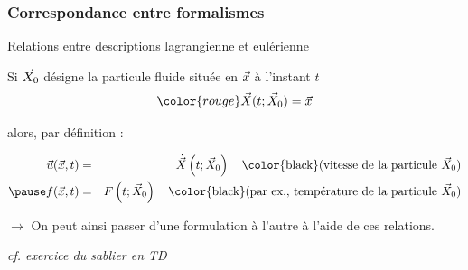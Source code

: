 \subsubsection{Correspondance entre formalismes}
\begin{frame}{Relations entre descriptions lagrangienne et eulérienne}

\small


Si $\vec{X}_0$ désigne la particule fluide située en $\vec{x}$ à l'instant $t$
\[
	\color{rouge}
	\myvec{X}(t; \myvec{X}_0) = \myvec{x}
\]

\pause

alors, par définition :

{\color{rouge}
\begin{eqnarray}
	\myvec{u}(\myvec{x}, t) & = & \dot{\myvec{X}}\left ( t; \myvec{X}_0 \right )
	\quad \mbox{\color{black}(vitesse de la particule $\myvec{X}_0$)}
	\\ \pause
	f(\myvec{x}, t) & = & F\left ( t; \myvec{X}_0 \right )
	\quad \mbox{\color{black}(par ex., température de la particule $\myvec{X}_0$)}
\end{eqnarray}
}

\bigskip

$\rightarrow$ On peut ainsi passer d'une formulation à l'autre à l'aide de ces relations.

\medskip
\hfill \textsl{\color{vert} cf. exercice du sablier en TD}

\vspace{20mm}

\end{frame}

